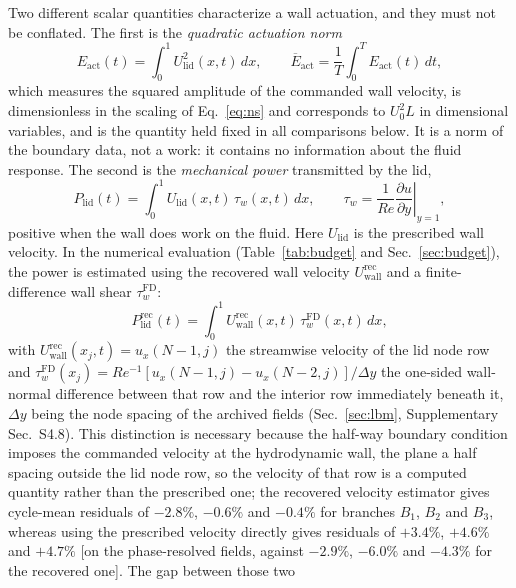 \documentclass[11pt,a4paper]{article}
\newcommand{\Eact}{E_{\mathrm{act}}}
\newcommand{\Plid}{P_{\mathrm{lid}}}
\begin{document}
Two different scalar quantities characterize a wall actuation, and they must not
be conflated. The first is the \emph{quadratic actuation norm}
\begin{equation}
\Eact(t)=\int_0^1 U_{\mathrm{lid}}^2(x,t)\,dx,
\qquad
\overline{E}_{\mathrm{act}}=\frac{1}{T}\int_0^T\Eact(t)\,dt,
\label{eq:eact}
\end{equation}
which measures the squared amplitude of the commanded wall velocity, is
dimensionless in the scaling of Eq.~\eqref{eq:ns} and corresponds to $U_0^2L$ in
dimensional variables, and is the quantity held fixed in all comparisons below.
It is a norm of
the boundary data, not a work: it contains no information about the fluid response.
The second is the \emph{mechanical power} transmitted by the lid,
\begin{equation}
\Plid(t)=\int_0^1 U_{\mathrm{lid}}(x,t)\,\tau_w(x,t)\,dx,
\qquad
\tau_w=\frac{1}{Re}\left.\frac{\partial u}{\partial y}\right|_{y=1},
\label{eq:plid}
\end{equation}
positive when the wall does work on the fluid. Here $U_{\mathrm{lid}}$ is the
prescribed wall velocity. In the numerical evaluation (Table~\ref{tab:budget}
and Sec.~\ref{sec:budget}), the power is estimated using the recovered wall
velocity $U_{\mathrm{wall}}^{\mathrm{rec}}$ and a finite-difference wall shear
$\tau_w^{\mathrm{FD}}$:
\begin{equation}
\Plid^{\mathrm{rec}}(t)=\int_0^1 U_{\mathrm{wall}}^{\mathrm{rec}}(x,t)\,\tau_w^{\mathrm{FD}}(x,t)\,dx,
\label{eq:plid_rec}
\end{equation}
with $U_{\mathrm{wall}}^{\mathrm{rec}}(x_j,t)=u_x(N-1,j)$ the streamwise velocity of
the lid node row and
$\tau_w^{\mathrm{FD}}(x_j)=Re^{-1}[u_x(N-1,j)-u_x(N-2,j)]/\Delta y$ the one-sided
wall-normal difference between that row and the interior row immediately beneath it,
$\Delta y$ being the node spacing of the archived fields (Sec.~\ref{sec:lbm},
Supplementary Sec.~S4.8).
This distinction is necessary because the half-way boundary condition imposes the
commanded velocity at the hydrodynamic wall, the plane a half spacing outside the lid
node row, so the velocity of that row is a computed quantity rather than the
prescribed one; the recovered velocity estimator
gives cycle-mean residuals of $-2.8\%$, $-0.6\%$ and $-0.4\%$ for branches $B_1$,
$B_2$ and $B_3$, whereas using the prescribed velocity directly gives residuals of
$+3.4\%$, $+4.6\%$ and $+4.7\%$ [on the phase-resolved fields, against
$-2.9\%$, $-6.0\%$ and $-4.3\%$ for the recovered one]. The gap between those two
\end{document}
